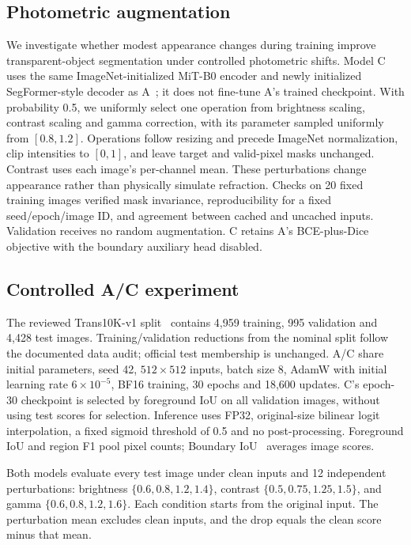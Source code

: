 
\subsection{Photometric augmentation}
We investigate whether modest appearance changes during training improve
transparent-object segmentation under controlled photometric shifts.
Model C uses the same ImageNet-initialized MiT-B0 encoder and newly initialized
SegFormer-style decoder as A~\cite{xie2021segformer}; it does not fine-tune A's
trained checkpoint. With probability 0.5, we uniformly select one operation
from brightness scaling, contrast scaling and gamma correction, with its
parameter sampled uniformly from $[0.8,1.2]$. Operations follow resizing and
precede ImageNet normalization, clip intensities to $[0,1]$, and leave target
and valid-pixel masks unchanged. Contrast uses each image's per-channel mean.
These perturbations change appearance rather than physically simulate refraction.
Checks on 20 fixed training images verified mask invariance, reproducibility
for a fixed seed/epoch/image ID, and agreement between cached and uncached
inputs. Validation receives no random augmentation. C retains A's
BCE-plus-Dice objective with the boundary auxiliary head disabled.

\subsection{Controlled A/C experiment}
The reviewed Trans10K-v1 split~\cite{xie2020transparent} contains 4,959 training,
995 validation and 4,428 test images. Training/validation reductions from the
nominal split follow the documented data audit; official test membership is
unchanged. A/C share initial parameters, seed 42, $512\times512$ inputs,
batch size 8, AdamW with initial learning rate $6\times10^{-5}$, BF16 training,
30 epochs and 18,600 updates. C's epoch-30 checkpoint is selected by foreground
IoU on all validation images, without using test scores for selection.
Inference uses FP32, original-size bilinear logit interpolation, a fixed
sigmoid threshold of 0.5 and no post-processing. Foreground IoU and region F1
pool pixel counts; Boundary IoU~\cite{cheng2021boundary} averages image scores.

Both models evaluate every test image under clean inputs and 12 independent
perturbations: brightness $\{0.6,0.8,1.2,1.4\}$, contrast
$\{0.5,0.75,1.25,1.5\}$, and gamma $\{0.6,0.8,1.2,1.6\}$.
Each condition starts from the original input. The perturbation mean excludes
clean inputs, and the drop equals the clean score minus that mean.

